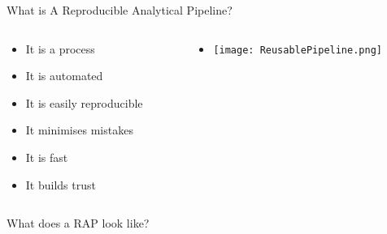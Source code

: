 \documentclass[xcolor=x11names,compress]{beamer}
\renewcommand{\(}{\begin{columns}}
\renewcommand{\)}{\end{columns}}
\newcommand{\<}[1]{\begin{column}{#1}}
\renewcommand{\>}{\end{column}}
\begin{document}
\begin{frame}{What is A Reproducible Analytical Pipeline?}
  \begin{columns}[T]
    \begin{column}{0.5\textwidth}
      \begin{itemize}[<+->]
        \item It is a process %
        \item It is automated
        \item It is easily reproducible
        \item It minimises mistakes
        \item It is fast
        \item It builds trust
      \end{itemize}
    \end{column}
    \begin{column}{0.5\textwidth}
    \begin{itemize}
        \item[] \texttt{[image: ReusablePipeline.png]}
    \end{itemize}
    \end{column}
  \end{columns}
\end{frame}

\begin{frame}{What does a RAP look like?}
 \begin{center}
  \begin{itemize}
    \end{itemize}
\end{center}
\end{frame}
\end{document}
